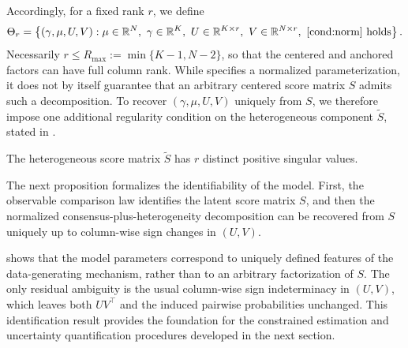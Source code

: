 \documentclass{article}
\begin{document}
\begin{bibunit}[unsrtnat]
Accordingly, for a fixed rank \(r\), we define
\[
\Theta_r
=
\left\{
(\gamma,\mu,U,V):
\mu\in\RR^N,\ \gamma\in\RR^K,\ U\in\RR^{K\times r},\ V\in\RR^{N\times r},
\ \text{\Cref{cond:norm} holds}
\right\}.
\]
Necessarily \(r\le R_{\max}:=\min\{K-1,N-2\}\), so that the centered and anchored factors can have 
full column rank. While  specifies a normalized parameterization, it does not 
by itself guarantee that an arbitrary centered score matrix \(S\) admits such a decomposition. To recover 
\((\gamma,\mu,U,V)\) uniquely from \(S\), we therefore impose one additional regularity condition on the 
heterogeneous component \(\tilde{S}\), stated in .
\begin{condition}[Rank]\label{cond:S-rank}
    The heterogeneous score matrix $\tilde{S}$ has $r$ distinct positive singular values.
\end{condition}

The next proposition formalizes the identifiability of the model. 
First, the observable comparison law identifies the latent score matrix \(S\), and then the normalized consensus-plus-heterogeneity decomposition can be recovered from \(S\) uniquely up to column-wise sign changes in \((U,V)\).



 shows that the model parameters correspond to uniquely defined features of the data-generating mechanism, rather than to an arbitrary factorization of \(S\). The only residual ambiguity is the usual column-wise sign indeterminacy in \((U,V)\), which leaves both \(UV^\top\) and the induced pairwise probabilities unchanged. This identification result provides the foundation for the constrained estimation and uncertainty quantification procedures developed in the next section.






\end{bibunit}
\end{document}
